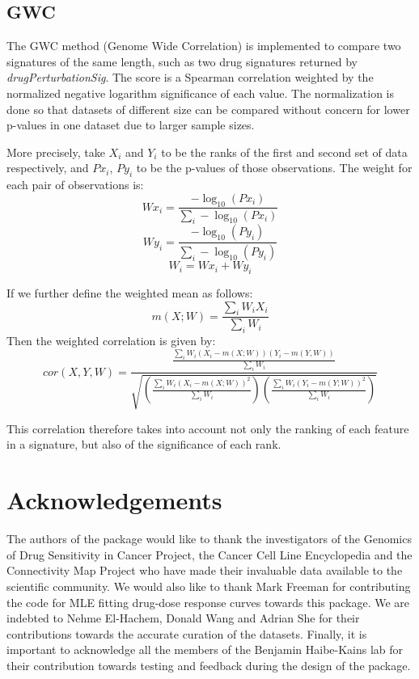\documentclass[11pt]{article}
\begin{document}
\subsection{GWC}

The GWC method (Genome Wide Correlation) is implemented to compare two signatures of the same length, such as two drug signatures returned by \textit{drugPerturbationSig}. The score is a Spearman correlation weighted by the normalized negative logarithm significance of each value. The normalization is done so that datasets of different size can be compared without concern for lower p-values in one dataset due to larger sample sizes. 

More precisely, take $X_i$ and $Y_i$ to be the ranks of the first and second set of data respectively, and $Px_i$, $Py_i$ to be the p-values of those observations. The weight for each pair of observations is:
$$Wx_i = \frac{-\log_{10}(Px_i)}{\sum_{i}-\log_{10}(Px_i)}$$
$$Wy_i = \frac{-\log_{10}(Py_i)}{\sum_{i}-\log_{10}(Py_i)}$$
$$W_i = Wx_i + Wy_i$$

If we further define the weighted mean as follows:
$$ m(X;W) = \frac{\sum_i W_i X_i}{\sum_i{W_i}}$$
Then the weighted correlation is given by:
$$ cor(X,Y,W) = \frac{\frac{\sum_i W_i (X_i - m(X;W))(Y_i - m(Y,W))}{\sum_i W_i}}{\sqrt{(\frac{\sum_i W_i (X_i - m(X;W))^2}{\sum_i W_i})(\frac{\sum_i W_i (Y_i - m(Y;W))^2}{\sum_i W_i})}}$$

This correlation therefore takes into account not only the ranking of each feature in a signature, but also of the significance of each rank.

\section{Acknowledgements}
The authors of the package would like to thank the investigators of the Genomics of Drug Sensitivity in Cancer Project, the Cancer Cell Line Encyclopedia and the Connectivity Map Project who have made their invaluable data available to the scientific community. We would also like to thank Mark Freeman for contributing the code for MLE fitting drug-dose response curves towards this package. We are indebted to Nehme El-Hachem, Donald Wang and Adrian She for their contributions towards the accurate curation of the datasets. Finally, it is important to acknowledge all the members of the Benjamin Haibe-Kains lab for their contribution towards testing and feedback during the design of the package.\\
\end{document}
